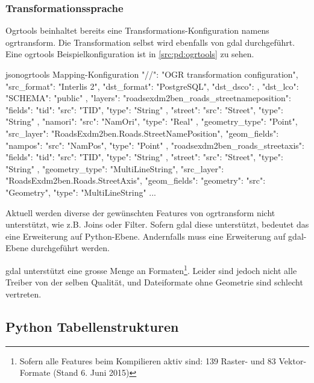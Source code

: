 \subsubsection{Transformationssprache}
Ogrtools beinhaltet bereits eine Transformations-Konfiguration namens ogrtransform. Die Transformation selbst wird ebenfalls von \gls{gdal} durchgeführt.
Eine ogrtools Beispielkonfiguration \cite[README, ogrtransform library]{ogrtools} ist in \cref{src:pd:ogrtools} zu sehen.

\begin{srclst}[label=src:pd:ogrtools]{json}{ogrtools Mapping-Konfiguration}
{
  "//": "OGR transformation configuration",
  "src_format": "Interlis 2",
  "dst_format": "PostgreSQL",
  "dst_dsco": {},
  "dst_lco": {
    "SCHEMA": "public"
  },
  "layers": {
    "roadsexdm2ben_roads_streetnameposition": {
      "fields": {
        "tid": {
          "src": "TID",
          "type": "String"
        },
        "street": {
          "src": "Street",
          "type": "String"
        },
        "namori": {
          "src": "NamOri",
          "type": "Real"
        }
      },
      "geometry_type": "Point",
      "src_layer": "RoadsExdm2ben.Roads.StreetNamePosition",
      "geom_fields": {
        "nampos": {
          "src": "NamPos",
          "type": "Point"
        }
      }
    },
    "roadsexdm2ben_roads_streetaxis": {
      "fields": {
        "tid": {
          "src": "TID",
          "type": "String"
        },
        "street": {
          "src": "Street",
          "type": "String"
        }
      },
      "geometry_type": "MultiLineString",
      "src_layer": "RoadsExdm2ben.Roads.StreetAxis",
      "geom_fields": {
        "geometry": {
          "src": "Geometry",
          "type": "MultiLineString"
        }
      }
    }
  }
  ...
}
\end{srclst}

Aktuell werden diverse der gewünschten Features von ogrtransform nicht unterstützt, wie z.B. Joins oder Filter. Sofern \gls{gdal} diese unterstützt, bedeutet das eine Erweiterung auf Python-Ebene. Andernfalls muss eine Erweiterung auf \gls{gdal}-Ebene durchgeführt werden.

\gls{gdal} unterstützt eine grosse Menge an Formaten\footnote{Sofern alle Features beim Kompilieren aktiv sind: 139 Raster- und 83 Vektor-Formate (Stand 6. Juni 2015)}. Leider sind jedoch nicht alle Treiber von der selben Qualität, und Dateiformate ohne Geometrie sind schlecht vertreten.

\subsection{Python Tabellenstrukturen}

